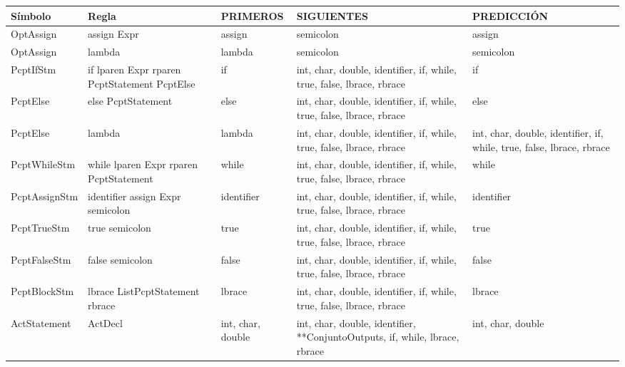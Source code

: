 \begin{tabularx}{\textwidth}{BBBBB}
          \toprule
          Símbolo & Regla & PRIMEROS & SIGUIENTES & PREDICCIÓN \\ \hline
          \midrule
OptAssign & assign Expr & assign & semicolon & assign \\ \hline
     OptAssign & lambda & lambda & semicolon & semicolon \\ \hline
           
     PcptIfStm & if lparen Expr rparen PcptStatement PcptElse & if    & int, char, double, identifier, if, while, true, false, lbrace, rbrace & if \\ \hline
     PcptElse & else PcptStatement & else  & int, char, double, identifier, if, while, true, false, lbrace, rbrace & else \\ \hline
     PcptElse & lambda & lambda & int, char, double, identifier, if, while, true, false, lbrace, rbrace & int, char, double, identifier, if, while, true, false, lbrace, rbrace \\ \hline
           
     PcptWhileStm & while lparen Expr rparen PcptStatement & while & int, char, double, identifier, if, while, true, false, lbrace, rbrace & while \\ \hline
           
     PcptAssignStm & identifier assign Expr semicolon & identifier & int, char, double, identifier, if, while, true, false, lbrace, rbrace & identifier \\ \hline
           
     PcptTrueStm & true semicolon & true  & int, char, double, identifier, if, while, true, false, lbrace, rbrace & true \\ \hline
           
     PcptFalseStm & false semicolon & false & int, char, double, identifier, if, while, true, false, lbrace, rbrace & false \\ \hline
           
     PcptBlockStm & lbrace ListPcptStatement rbrace & lbrace & int, char, double, identifier, if, while, true, false, lbrace, rbrace & lbrace \\ \hline
           
     ActStatement & ActDecl & int, char, double & int, char, double, identifier, **ConjuntoOutputs, if, while, lbrace, rbrace & int, char, double \\ \hline

 \bottomrule
     \end{tabularx}%

